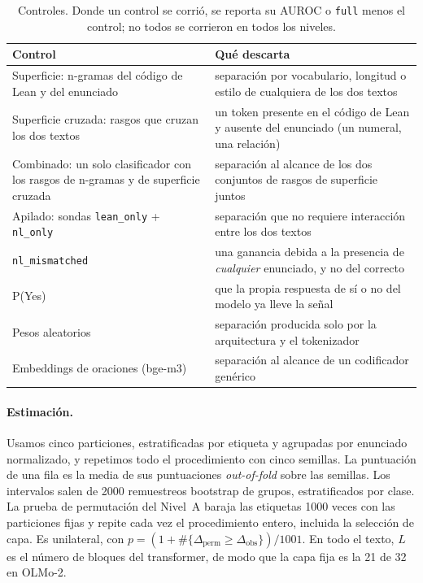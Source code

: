 \documentclass[10pt]{article}
\newcommand{\vr}[1]{\texttt{#1}}
\newcommand{\D}{\Delta}
\begin{document}
\begin{table}[h]
\centering
\caption{Controles. Donde un control se corrió, se reporta su AUROC o \vr{full} menos el control; no todos se corrieron en todos los niveles.}
\label{tab:controles}
\vspace{2pt}
\begin{tabularx}{\linewidth}{@{}lX@{}}
\toprule
Control & Qué descarta\\
\midrule
Superficie: n-gramas del código de Lean y del enunciado & separación por vocabulario, longitud o estilo de cualquiera de los dos textos\\
Superficie cruzada: rasgos que cruzan los dos textos & un token presente en el código de Lean y ausente del enunciado (un numeral, una relación)\\
Combinado: un solo clasificador con los rasgos de n-gramas y de superficie cruzada & separación al alcance de los dos conjuntos de rasgos de superficie juntos\\
Apilado: sondas \vr{lean\_only} + \vr{nl\_only} & separación que no requiere interacción entre los dos textos\\
\vr{nl\_mismatched} & una ganancia debida a la presencia de \emph{cualquier} enunciado, y no del correcto\\
P(Yes) & que la propia respuesta de sí o no del modelo ya lleve la señal\\
Pesos aleatorios & separación producida solo por la arquitectura y el tokenizador\\
Embeddings de oraciones (bge-m3) & separación al alcance de un codificador genérico\\
\bottomrule
\end{tabularx}
\end{table}

\paragraph{Estimación.}
Usamos cinco particiones, estratificadas por etiqueta y agrupadas por enunciado normalizado, y repetimos todo el
procedimiento con cinco semillas. La puntuación de una fila es la media de sus puntuaciones \emph{out-of-fold}
sobre las semillas. Los intervalos salen de 2000 remuestreos bootstrap de grupos, estratificados por clase. La
prueba de permutación del Nivel~A baraja las etiquetas 1000 veces con las particiones fijas y repite cada vez el
procedimiento entero, incluida la selección de capa. Es unilateral, con
$p = (1 + \#\{\D_{\mathrm{perm}} \ge \D_{\mathrm{obs}}\})/1001$. En todo el texto, $L$ es el número de bloques del
transformer, de modo que la capa fija es la 21 de 32 en OLMo-2.
\end{document}
